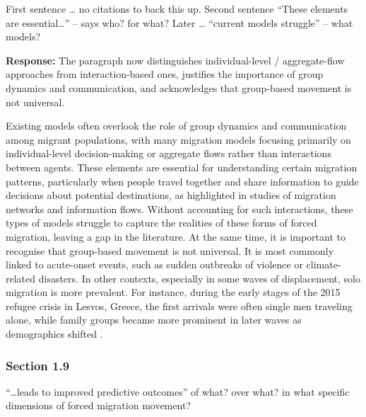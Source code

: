 \documentclass[11pt,a4paper]{article}
\begin{document}
\begin{reviewbox}
First sentence \ldots{} no citations to back this up. Second sentence ``These elements are essential\ldots'' -- says who? for what? Later \ldots{} ``current models struggle'' -- what models?
\end{reviewbox}

\textbf{Response:} The paragraph now distinguishes individual-level / aggregate-flow approaches from
interaction-based ones, justifies the importance of group dynamics and communication, and acknowledges that
group-based movement is not universal.

\vspace{0.3cm}
\begin{updatebox}
Existing models often overlook the role of group dynamics and communication among migrant populations, with many migration
models focusing primarily on individual-level decision-making or aggregate flows rather than interactions between agents.
These elements are essential for understanding certain migration patterns, particularly when people travel together and share
information to guide decisions about potential destinations, as highlighted in studies of migration networks and information
flows. Without accounting for such interactions, these types of models struggle to capture the realities of these forms of
forced migration, leaving a gap in the literature. At the same time, it is important to recognise that group-based movement
is not universal. It is most commonly linked to acute-onset events, such as sudden outbreaks of violence or climate-related
disasters. In other contexts, especially in some waves of displacement, solo migration is more prevalent. For instance,
during the early stages of the 2015 refugee crisis in Lesvos, Greece, the first arrivals were often single men traveling
alone, while family groups became more prominent in later waves as demographics shifted
\citep{unhcr_sea_arrivals_2015,crawley2016unpacking}.
\end{updatebox}

\subsubsection*{Section 1.9}

\begin{reviewbox}
``\ldots{}leads to improved predictive outcomes'' of what? over what? in what specific dimensions of forced migration movement?
\end{reviewbox}
\end{document}
